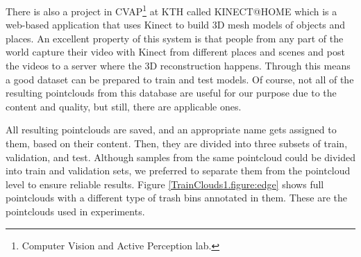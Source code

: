 There is also a project in CVAP\footnote{Computer Vision and Active Perception lab.} at KTH called KINECT@HOME \cite{aydemir2012kinect} which is a web-based application that uses Kinect to build 3D mesh models of objects and places. 
An excellent property of this system is that people from any part of the world capture their video with Kinect from different places and scenes and post the videos to a server where the 3D reconstruction happens. 
Through this means a good dataset can be prepared to train and test models.
Of course, not all of the resulting pointclouds from this database are useful for our purpose due to the content and
quality, but still, there are applicable ones.


All resulting pointclouds are saved, and an appropriate name gets assigned to them, based on their content.  
Then, they are divided into three subsets of train, validation, and test. 
Although samples from the same pointcloud could be divided into train and validation sets, we preferred to separate them from the pointcloud level to ensure reliable results. 
Figure \ref{TrainClouds1.figure:edge} shows full pointclouds with a different type of trash bins annotated in them. 
These are the pointclouds used in experiments.



